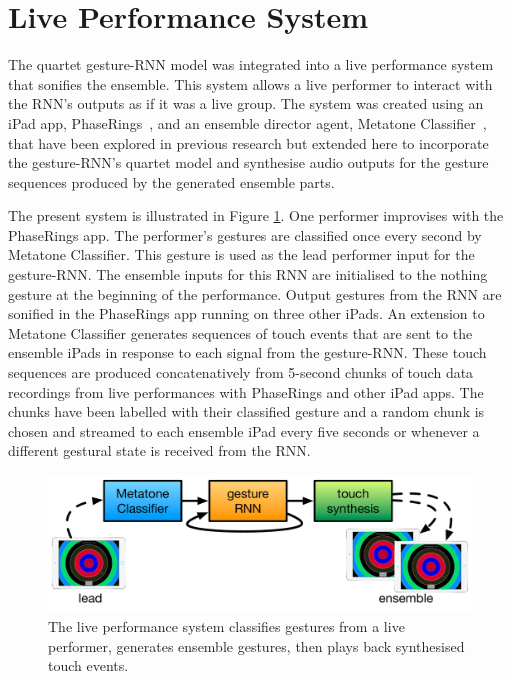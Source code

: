 \documentclass[sigchi, authorversion=true]{acmart}
\begin{document}
\section{Live Performance System}

The quartet gesture-RNN model was integrated into a live performance
system that sonifies the ensemble. This system allows a live performer
to interact with the RNN's outputs as if it was a live group.
The system was created using an iPad app,
PhaseRings~\cite{Martin:2016ah}, and an ensemble director agent,
Metatone Classifier~\cite{Martin:2016xu}, that have been explored in
previous research but extended here to incorporate the gesture-RNN's
quartet model and synthesise audio outputs for the gesture sequences
produced by the generated ensemble parts.

The present system is illustrated in Figure
\ref{fig:live-performance-system}. One performer improvises with the
PhaseRings app. The performer's gestures are classified once every
second by Metatone Classifier. This gesture is used as the lead
performer input for the gesture-RNN. The ensemble inputs for this RNN
are initialised to the nothing gesture at the beginning of the
performance. Output gestures from the RNN are sonified in the
PhaseRings app running on three other iPads. An extension to Metatone
Classifier generates sequences of touch events that are sent to the
ensemble iPads in response to each signal from the gesture-RNN. These
touch sequences are produced concatenatively from 5-second chunks of
touch data recordings from live performances with PhaseRings and other
iPad apps. The chunks have been labelled with their classified gesture
and a random chunk is chosen and streamed to each ensemble iPad every
five seconds or whenever a different gestural state is received from
the RNN.

\begin{figure}
  \centering
  \includegraphics[width=\columnwidth]{live-performance-system}
  \caption{The live performance system classifies gestures from a live
  performer, generates ensemble gestures, then plays back synthesised
  touch events.}\label{fig:live-performance-system}
\end{figure}
\end{document}
